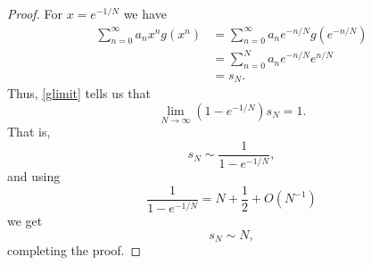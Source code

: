 \documentclass{article}
\begin{document}
\begin{proof}
For $x=e^{-1/N}$ we have
\begin{align*}
\sum_{n=0}^\infty a_n x^n g(x^n) &= \sum_{n=0}^\infty 
a_n e^{-n/N} g(e^{-n/N})\\
&=\sum_{n=0}^N a_n e^{-n/N} e^{n/N}\\
&=s_N.
\end{align*}
Thus, \eqref{glimit}  tells us that
\[
\lim_{N \to \infty} (1-e^{-1/N}) s_N = 1.
\]
That is,
\[
s_N \sim \frac{1}{1-e^{-1/N}},
\]
and using
\[
\frac{1}{1-e^{-1/N}} = N+\frac{1}{2}+O(N^{-1})
\]
we get
\[
s_N \sim N,
\]
completing the proof.
\end{proof}
\end{document}
